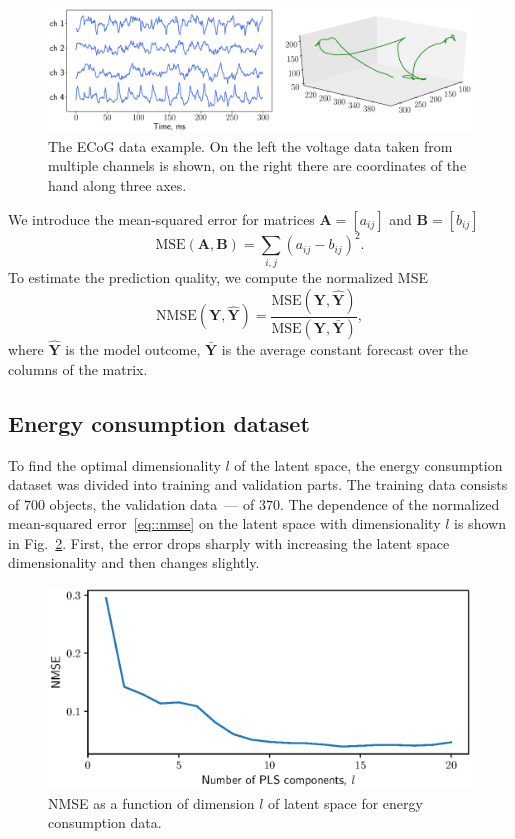 \documentclass[preprint,12pt]{elsarticle}
\newcommand{\bY}{\mathbf{Y}}
\begin{document}
\begin{figure}
	\includegraphics[width=\linewidth]{figs/ecog_data.eps}
	\caption{The ECoG data example. On the left the voltage data taken from multiple channels is shown, on the right there are coordinates of the hand along three axes.}
	\label{fig::ecog_data}
\end{figure}

We introduce the mean-squared error for matrices $\mathbf{A} = [a_{ij}]$ and $\mathbf{B} = [b_{ij}]$ 
\[
\text{MSE} (\mathbf{A}, \mathbf{B}) = \sum_{i,j} (a_{ij} - b_{ij})^2.
\]
To estimate the prediction quality, we compute the normalized MSE 
\begin{equation}
\text{NMSE}(\bY,  \mathbf{\hat{Y}}) = \frac{\text{MSE} (\bY, \mathbf{\hat{Y}})}{\text{MSE} (\bY, \mathbf{\bar{Y}})},
\label{eq::nmse}
\end{equation}
where $\mathbf{\hat{Y}}$ is the model outcome, $\mathbf{\bar{Y}}$ is the average constant forecast over the columns of the matrix.

\subsection{Energy consumption dataset}

To find the optimal dimensionality $l$ of the latent space, the energy consumption dataset was divided into training and validation parts. 
The training data consists of $700$ objects, the validation data~--- of $370$. The dependence of the normalized mean-squared error~\eqref{eq::nmse} on the latent space with dimensionality $l$ is shown in Fig.~\ref{fig::energy_n_comp}. 
First, the error drops sharply with increasing the latent space dimensionality and then changes slightly.

\begin{figure}[!h]
	\centering
	\includegraphics[width=0.75\linewidth]{figs/energy_n_comp}
	\caption{NMSE as a function of dimension $l$ of latent space for energy consumption data.}
	\label{fig::energy_n_comp}
\end{figure}
\end{document}

